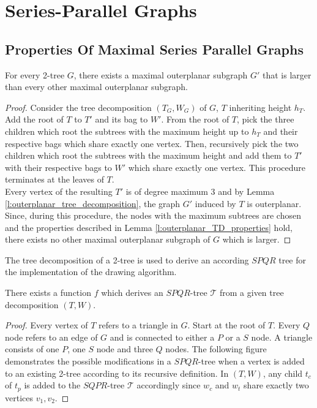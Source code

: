 \section{Series-Parallel Graphs}\label{section:SP-graphs}



\subsection{Properties Of Maximal Series Parallel Graphs}


\begin{lemma}
	For every 2-tree $G$, there exists a maximal outerplanar subgraph $G'$ that is larger than every other maximal outerplanar subgraph.
\end{lemma}
\begin{proof}
	Consider the tree decomposition $(T_G,W_G)$ of $G$, $T$ inheriting height $h_T$. Add the root of $T$ to $T'$ and its bag to $W'$. From the root of $T$, pick the three children which root the subtrees with the maximum height up to $h_T$ and their respective bags which share exactly one vertex. Then, recursively pick the two children which root the subtrees with the maximum height and add them to $T'$ with their respective bags to $W'$ which share exactly one vertex. This procedure terminates at the leaves of $T$.\\
	Every vertex of the resulting $T'$ is of degree maximum 3 and by Lemma \ref{l:outerplanar_tree_decomposition}, the graph $G'$ induced by $T$ is outerplanar. Since, during this procedure, the nodes with the maximum subtrees are chosen and the properties described in Lemma \ref{l:outerplanar_TD_properties} hold, there exists no other maximal outerplanar subgraph of $G$ which is larger. 
\end{proof}

The tree decomposition of a 2-tree is used to derive an according $SPQR$ tree for the implementation of the drawing algorithm.

\begin{lemma}
	There exists a function $f$ which derives an $SPQR$-tree $\mathcal{T}$ from a given tree decomposition $(T,W)$.
\end{lemma}
\begin{proof}
	Every vertex of $T$ refers to a triangle in $G$. Start at the root of $T$. Every $Q$ node refers to an edge of $G$ and is connected to either a $P$ or a $S$ node. A triangle consists of one $P$, one $S$ node and three $Q$ nodes. The following figure demonstrates the possible modifications in a $SPQR$-tree when a vertex is added to an existing 2-tree according to its recursive definition.
	In $(T,W)$, any child $t_c$ of $t_p$ is added to the $SQPR$-tree $\mathcal{T}$ accordingly since $w_c$ and $w_t$ share exactly two vertices $v_1,v_2$.
\end{proof}

